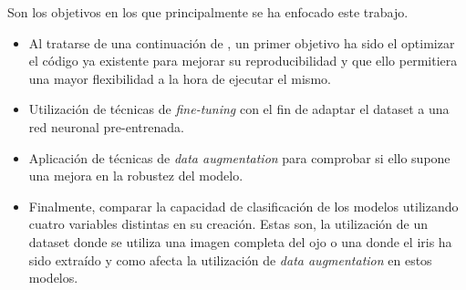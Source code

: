  \label{capitulo2}

Son los objetivos en los que principalmente se ha enfocado este trabajo.

\begin{itemize}
    \item Al tratarse de una continuación de \cite{tfg_iris_2020}, un primer objetivo ha sido el optimizar el código ya existente para 
    mejorar su reproducibilidad y que ello permitiera una mayor flexibilidad a la hora de ejecutar el mismo.
    \item Utilización de técnicas de \textit{fine-tuning} con el fin de adaptar el dataset a una red neuronal pre-entrenada.
    \item Aplicación de técnicas de \textit{data augmentation} para comprobar si ello supone una mejora en la robustez del modelo.
    \item Finalmente, comparar la capacidad de clasificación de los modelos utilizando cuatro variables distintas en su creación. Estas son, la utilización de un dataset donde se utiliza una imagen completa del ojo o una donde el iris ha sido extraído y como afecta la utilización de \textit{data augmentation} en estos modelos.                                                                                                                                                                                                           
\end{itemize}

